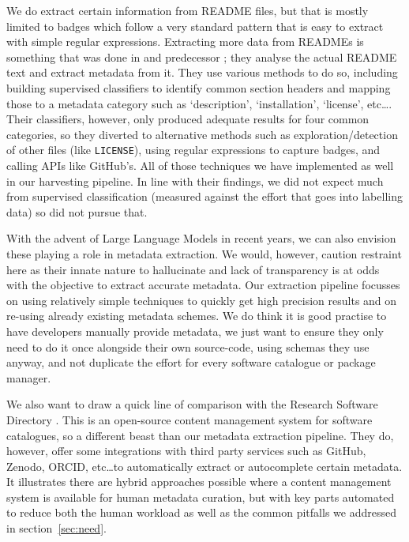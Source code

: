 \documentclass[a4paper,11pt]{article}
\begin{document}
We do extract certain information from README files, but that is mostly limited to
badges which follow a very standard pattern that is easy to extract with simple
regular expressions. Extracting more data from READMEs is something that was
done in \cite{SOMEF} and predecessor \cite{SOMEF19}; they analyse the actual
README text and extract metadata from it. They use various methods to do so,
including building supervised classifiers to identify common section headers
and mapping those to a metadata category such as `description', `installation',
`license', etc\ldots. Their classifiers, however, only produced adequate
results for four common categories, so they diverted to alternative methods
such as exploration/detection of other files (like \texttt{LICENSE}), using
regular expressions to capture badges, and calling APIs like GitHub's. All of
those techniques we have implemented as well in our harvesting pipeline. In
line with their findings, we did not expect much from supervised classification
(measured against the effort that goes into labelling data) so did not pursue
that.

With the advent of Large Language Models in recent years, we can also envision
these playing a role in metadata extraction. We would, however, caution
restraint here as their innate nature to hallucinate and lack of transparency
is at odds with the objective to extract accurate metadata. Our extraction
pipeline focusses on using relatively simple techniques to quickly get high
precision results and on re-using already existing metadata schemes. We do
think it is good practise to have developers manually provide metadata, we just
want to ensure they only need to do it once alongside their own source-code,
using schemas they use anyway, and not duplicate the effort for every software
catalogue or package manager.

We also want to draw a quick line of comparison with the Research Software
Directory \citep{RSD, RSD2}. This is an open-source content management system
for software catalogues, so a different beast than our metadata extraction
pipeline. They do, however, offer some integrations with third party services
such as GitHub, Zenodo, ORCID, etc\ldots to automatically extract or
autocomplete certain metadata. It illustrates there are hybrid approaches
possible where a content management system is available for human metadata
curation, but with key parts automated to reduce both the human workload as well as 
the common pitfalls we addressed in
section~\ref{sec:need}.
\end{document}
